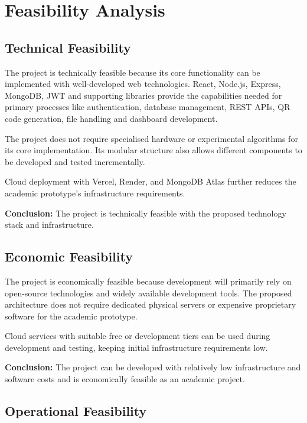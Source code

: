 \documentclass[11pt,a4paper]{article}
\begin{document}
\section{Feasibility Analysis}

\subsection{Technical Feasibility}

The project is technically feasible because its core functionality can be implemented with well-developed web technologies. React, Node.js, Express, MongoDB, JWT and supporting libraries provide the capabilities needed for primary processes like authentication, database management, REST APIs, QR code generation, file handling and dashboard development.

The project does not require specialised hardware or experimental algorithms for its core implementation. Its modular structure also allows different components to be developed and tested incrementally.

Cloud deployment with Vercel, Render, and MongoDB Atlas further reduces the academic prototype's infrastructure requirements.

\textbf{Conclusion:} The project is technically feasible with the proposed technology stack and infrastructure.

\subsection{Economic Feasibility}

The project is economically feasible because development will primarily rely on open-source technologies and widely available development tools. The proposed architecture does not require dedicated physical servers or expensive proprietary software for the academic prototype.

Cloud services with suitable free or development tiers can be used during development and testing, keeping initial infrastructure requirements low.

\textbf{Conclusion:} The project can be developed with relatively low infrastructure and software costs and is economically feasible as an academic project.

\subsection{Operational Feasibility}
\end{document}
